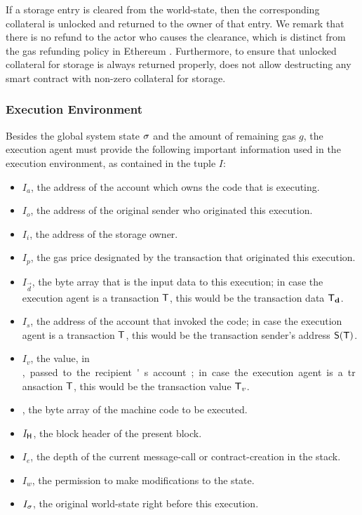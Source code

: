 	If a storage entry is cleared from the world-state,
	then the corresponding collateral is unlocked and returned to the owner of that entry.
	We remark that there is no refund to the actor who causes the clearance, 
	which is distinct from the gas refunding policy in Ethereum \cite{ETH_yellow}.
	Furthermore, to ensure that unlocked collateral for storage is always returned properly, 
	\name does not allow destructing any smart contract with non-zero collateral for storage.



\subsubsection{Execution Environment}
\label{subsubsec:exe_env}
Besides the global system state $\mathbf{\sigma}$ and the amount of remaining gas $g$, 
the execution agent must provide the following important information used in the execution environment, as contained in the tuple $I$:
\begin{itemize}[nosep]
	\item $I_a$, the address of the account which owns the code that is executing.
	
	\item $I_o$, the address of the original sender who originated this execution.
	
	\item $I_i$, the address of the storage owner.

	\item $I_p$, the gas price designated by the transaction that originated this execution.

	\item $I_{\vec{d}}$, the byte array that is the input data to this execution; in case the execution agent is a transaction $\textsf{T}$, this would be the transaction data $\textsf{T}_{\mathbf{d}}$.

	\item $I_s$, the address of the account that invoked the code; in case the execution agent is a transaction $\textsf{T}$, this would be the transaction sender's address $\mathsf{S}{\left({\textsf{T}} \right)}$.

	 \item $I_v$, the value, in \unit, passed to the recipient's account; in case the execution agent is a transaction $\textsf{T}$, this would be the transaction value $\textsf{T}_v$.

	 \item {}, the byte array of the machine code to be executed.

	 \item $I_{\textsf{H}}$, the block header of the present block.

	 \item $I_e$, the depth of the current message-call or contract-creation in the stack.

	 \item $I_w$, the permission to make modifications to the state.

	 \item $I_{\mathbf{\sigma}}$, the original world-state right before this execution.
\end{itemize}

